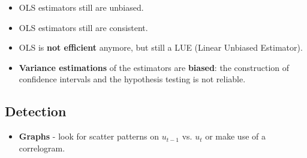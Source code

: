 \documentclass[10pt, a4paper, landscape]{article}
\begin{document}
\begin{multicols}{3}
\begin{itemize}[leftmargin=*]
	\item OLS estimators still are unbiased.
	\item OLS estimators still are consistent.
	\item OLS is \textbf{not efficient} anymore, but still a LUE (Linear Unbiased Estimator).
	\item \textbf{Variance estimations} of the estimators are \textbf{biased}: the construction of confidence intervals and the hypothesis testing is not reliable.
\end{itemize}

\subsection*{Detection}

\begin{itemize}[leftmargin=*]
	\item \textbf{Graphs} - look for scatter patterns on \( u_{t - 1} \) vs. \( u_{t} \) or make use of a correlogram.
	

\end{itemize}
\end{multicols}
\end{document}
